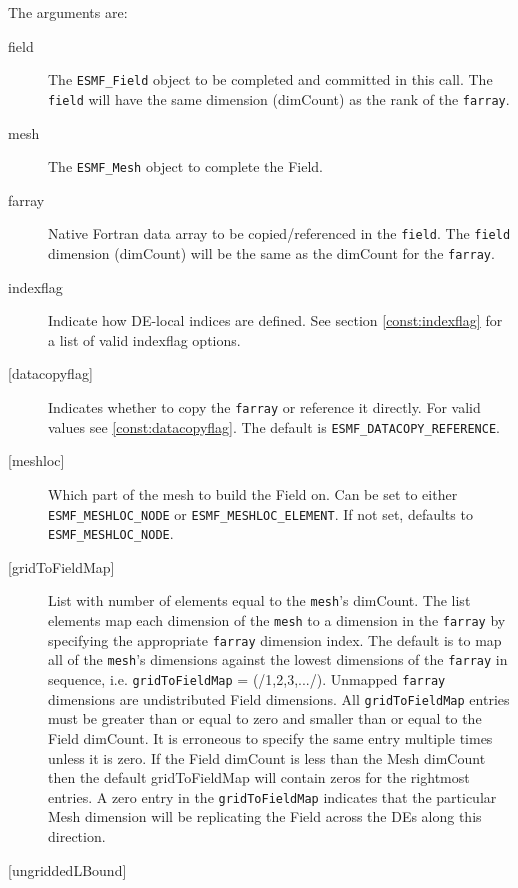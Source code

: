    The arguments are: 
   \begin{description} 
   \item [field] 
   The {\tt ESMF\_Field} object to be completed and 
   committed in this call. The {\tt field} will have the same dimension 
   (dimCount) as the rank of the {\tt farray}. 
   \item [mesh] 
   The {\tt ESMF\_Mesh} object to complete the Field. 
   \item [farray] 
   Native Fortran data array to be copied/referenced in the {\tt field}. 
   The {\tt field} dimension (dimCount) will be the same as the dimCount 
   for the {\tt farray}. 
   \item [indexflag] 
   Indicate how DE-local indices are defined. See section 
   \ref{const:indexflag} for a list of valid indexflag options. 
   \item [{[datacopyflag]}] 
   Indicates whether to copy the {\tt farray} or reference it directly. 
   For valid values see \ref{const:datacopyflag}. The default is 
   {\tt ESMF\_DATACOPY\_REFERENCE}. 
   \item [{[meshloc]}] 
   \begin{sloppypar} 
   Which part of the mesh to build the Field on. Can be set to either 
   {\tt ESMF\_MESHLOC\_NODE} or {\tt ESMF\_MESHLOC\_ELEMENT}. If not set, 
   defaults to {\tt ESMF\_MESHLOC\_NODE}. 
   \end{sloppypar} 
   \item [{[gridToFieldMap]}] 
   List with number of elements equal to the 
   {\tt mesh}'s dimCount. The list elements map each dimension 
   of the {\tt mesh} to a dimension in the {\tt farray} by 
   specifying the appropriate {\tt farray} dimension index. The 
   default is to map all of the {\tt mesh}'s dimensions against the 
   lowest dimensions of the {\tt farray} in sequence, i.e. 
   {\tt gridToFieldMap} = (/1,2,3,.../). 
   Unmapped {\tt farray} dimensions are undistributed Field 
   dimensions. 
   All {\tt gridToFieldMap} entries must be greater than or equal 
   to zero and smaller than or equal to the Field dimCount. It is erroneous 
   to specify the same entry multiple times unless it is zero. 
   If the Field dimCount is less than the Mesh dimCount then the default 
   gridToFieldMap will contain zeros for the rightmost entries. A zero 
   entry in the {\tt gridToFieldMap} indicates that the particular 
   Mesh dimension will be replicating the Field across the DEs along 
   this direction. 
   \item [{[ungriddedLBound]}] 

\end{description}
